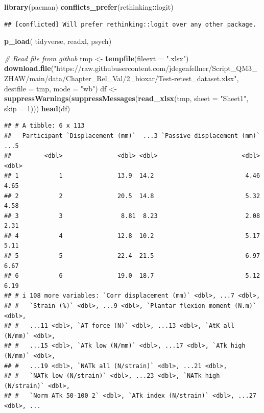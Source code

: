 \documentclass[
]{article}
\newenvironment{Shaded}{\begin{snugshade}}{\end{snugshade}}
\newcommand{\AttributeTok}[1]{\textcolor[rgb]{0.13,0.29,0.53}{#1}}
\newcommand{\CommentTok}[1]{\textcolor[rgb]{0.56,0.35,0.01}{\textit{#1}}}
\newcommand{\DecValTok}[1]{\textcolor[rgb]{0.00,0.00,0.81}{#1}}
\newcommand{\FunctionTok}[1]{\textcolor[rgb]{0.13,0.29,0.53}{\textbf{#1}}}
\newcommand{\NormalTok}[1]{#1}
\newcommand{\OtherTok}[1]{\textcolor[rgb]{0.56,0.35,0.01}{#1}}
\newcommand{\SpecialCharTok}[1]{\textcolor[rgb]{0.81,0.36,0.00}{\textbf{#1}}}
\newcommand{\StringTok}[1]{\textcolor[rgb]{0.31,0.60,0.02}{#1}}
\begin{document}
\begin{Shaded}
\begin{Highlighting}[]
\FunctionTok{library}\NormalTok{(pacman)}
\FunctionTok{conflicts\_prefer}\NormalTok{(rethinking}\SpecialCharTok{::}\NormalTok{logit)}
\end{Highlighting}
\end{Shaded}

\begin{verbatim}
## [conflicted] Will prefer rethinking::logit over any other package.
\end{verbatim}

\begin{Shaded}
\begin{Highlighting}[]
\FunctionTok{p\_load}\NormalTok{(}
\NormalTok{  tidyverse,}
\NormalTok{  readxl,}
\NormalTok{  psych)}

\CommentTok{\# Read file from github}
\NormalTok{tmp }\OtherTok{\textless{}{-}} \FunctionTok{tempfile}\NormalTok{(}\AttributeTok{fileext =} \StringTok{".xlsx"}\NormalTok{)}
\FunctionTok{download.file}\NormalTok{(}\StringTok{"https://raw.githubusercontent.com/jdegenfellner/Script\_QM3\_ZHAW/main/data/Chapter\_Rel\_Val/2\_bioxar/Test{-}retest\_dataset.xlsx"}\NormalTok{, }
              \AttributeTok{destfile =}\NormalTok{ tmp, }\AttributeTok{mode =} \StringTok{"wb"}\NormalTok{)}
\NormalTok{df }\OtherTok{\textless{}{-}} \FunctionTok{suppressWarnings}\NormalTok{(}\FunctionTok{suppressMessages}\NormalTok{(}\FunctionTok{read\_xlsx}\NormalTok{(tmp, }\AttributeTok{sheet =} \StringTok{"Sheet1"}\NormalTok{, }\AttributeTok{skip =} \DecValTok{1}\NormalTok{)))}
\FunctionTok{head}\NormalTok{(df)}
\end{Highlighting}
\end{Shaded}

\begin{verbatim}
## # A tibble: 6 x 113
##   Participant `Displacement (mm)`  ...3 `Passive displacement (mm)`  ...5
##         <dbl>               <dbl> <dbl>                       <dbl> <dbl>
## 1           1               13.9  14.2                         4.46  4.65
## 2           2               20.5  14.8                         5.32  4.58
## 3           3                8.81  8.23                        2.08  2.31
## 4           4               12.8  10.2                         5.17  5.11
## 5           5               22.4  21.5                         6.97  6.67
## 6           6               19.0  18.7                         5.12  6.19
## # i 108 more variables: `Corr displacement (mm)` <dbl>, ...7 <dbl>,
## #   `Strain (%)` <dbl>, ...9 <dbl>, `Plantar flexion moment (N.m)` <dbl>,
## #   ...11 <dbl>, `AT force (N)` <dbl>, ...13 <dbl>, `AtK all (N/mm)` <dbl>,
## #   ...15 <dbl>, `ATk low (N/mm)` <dbl>, ...17 <dbl>, `ATk high (N/mm)` <dbl>,
## #   ...19 <dbl>, `NATk all (N/strain)` <dbl>, ...21 <dbl>,
## #   `NATk low (N/strain)` <dbl>, ...23 <dbl>, `NATk high (N/strain)` <dbl>,
## #   `Norm ATk 50-100 2` <dbl>, `ATk index (N/strain)` <dbl>, ...27 <dbl>, ...
\end{verbatim}
\end{document}
